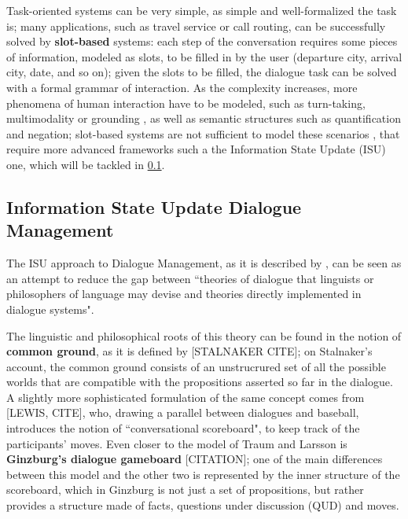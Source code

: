 Task-oriented systems can be very simple, as simple and well-formalized the task is;  many applications, such as travel service or call routing, can be successfully solved by \textbf{slot-based} systems: each step of the conversation requires some pieces of information, modeled as slots, to be filled in by the user (departure city, arrival city, date, and so on); given the slots to be filled, the dialogue task can be solved with a formal grammar of interaction. As the complexity increases, more phenomena of human interaction have to be modeled, such as turn-taking, multimodality or grounding
, as well as semantic structures such as quantification and negation; slot-based systems are not sufficient to model these scenarios \citep{Gabsdil03clarificationin}, that require more advanced frameworks such a the Information State Update (ISU) one, which will be tackled in \ref{ch:rw:ds:isu}.

\subsection{Information State Update Dialogue Management}\label{ch:rw:ds:isu}
The ISU approach to Dialogue Management, as it is described by \cite{TraumLarsson03p325}, can be seen as an attempt to reduce the gap between ``theories of dialogue that linguists or philosophers of language may devise and theories directly implemented in dialogue systems".

The linguistic and philosophical roots of this theory can be found in the notion of \textbf{common ground}, as it is defined by [STALNAKER CITE]; on Stalnaker's account, the common ground consists of an unstrucrured set of all the possible worlds that are compatible with the propositions asserted so far in the dialogue. A slightly more sophisticated formulation of the same concept comes from [LEWIS, CITE], who, drawing a parallel between dialogues and baseball, introduces the notion of ``conversational scoreboard", to keep track of the participants' moves. Even closer to the model of Traum and Larsson is \textbf{Ginzburg's dialogue gameboard} [CITATION]; one of the main differences between this model and the other two is represented by the inner structure of the scoreboard, which in Ginzburg is not just a set of propositions, but rather provides a structure made of facts, questions under discussion (QUD) and moves.

